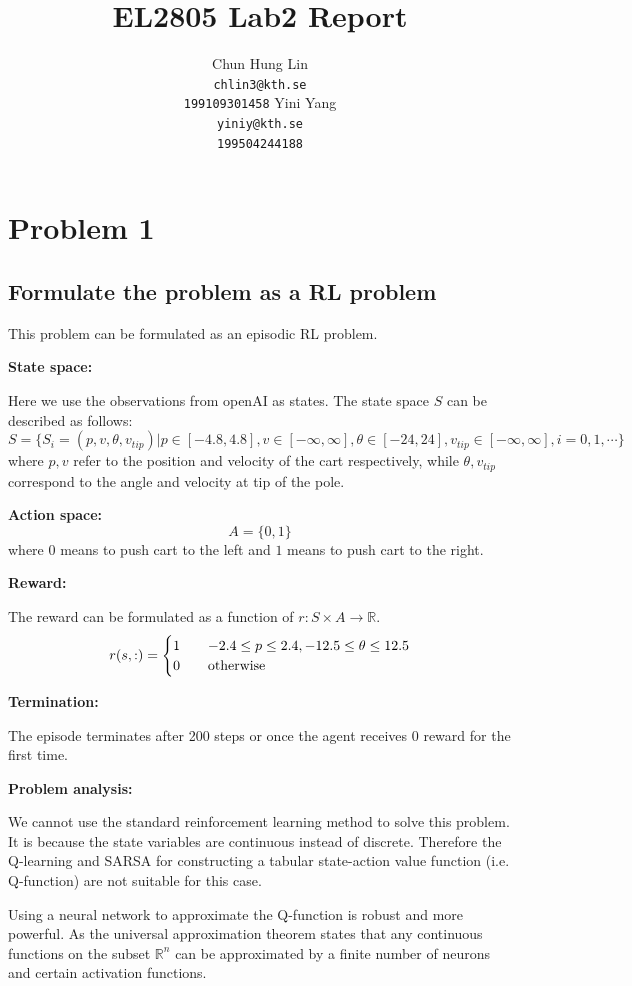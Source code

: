 \documentclass{article}
\title{EL2805 Lab2 Report}
\author{
  Chun Hung Lin \\
  \texttt{chlin3@kth.se} \\
  \texttt{199109301458}
  \And
  Yini Yang \\
  \texttt{yiniy@kth.se} \\
  \texttt{199504244188}
}
\begin{document}
\maketitle

\section{Problem 1}

\subsection{Formulate the problem as a RL problem}

This problem can be formulated as an episodic RL problem.

\textbf{State space:}

Here we use the observations from openAI as states. The state space $S$ can be described as follows:
$$ S = \{S_i=(p,v,\theta,v_{tip})|p\in[-4.8,4.8],v\in[-\infty,\infty],\theta\in[-24,24],v_{tip}\in[-\infty,\infty],i=0,1,\cdots\}$$
where $p,v$ refer to the position and velocity of the cart respectively, while $\theta,v_{tip}$ correspond to the angle and velocity at tip of the pole.

\textbf{Action space:}
$$A=\{0,1\}$$
where $0$ means to push cart to the left and $1$ means to push cart to the right.

\textbf{Reward:}

The reward can be formulated as a function of $r: S\times A\rightarrow \mathbb{R}$.
\begin{equation*}
  r(s, :) =
  \begin{cases}
    1  \quad &-2.4\leq p\leq 2.4, -12.5\leq \theta \leq 12.5\\
    0    \quad &\textup{otherwise}
  \end{cases}
\end{equation*}

\textbf{Termination:}

The episode terminates after 200 steps or once the agent receives 0 reward for the first time.

\textbf{Problem analysis:}

We cannot use the standard reinforcement learning method to solve this problem.
It is because the state variables are continuous instead of discrete.
Therefore the Q-learning and SARSA for constructing a tabular state-action value function (i.e. Q-function)
are not suitable for this case.

Using a neural network to approximate the Q-function is robust and more powerful. 
As the universal approximation theorem states that any continuous functions on the subset $\mathbb R^n$ 
can be approximated by a finite number of neurons and certain activation functions.
\end{document}
